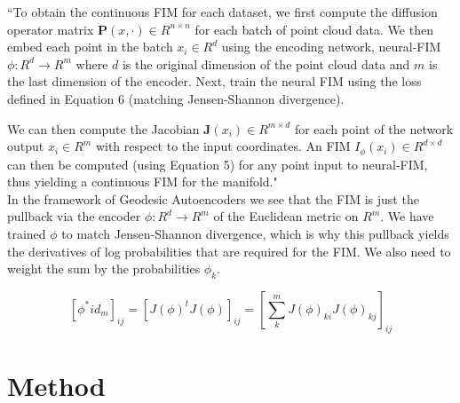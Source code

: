 \documentclass{article}
\theoremstyle{plain}
\theoremstyle{definition}
\theoremstyle{remark}
\begin{document}
``To obtain the continuous FIM for each dataset, we first compute the diffusion operator matrix $\mathbf{P}(x,\cdot) \in R^{n \times n}$ for each batch of point cloud data. We then embed each point in the batch $x_i \in R^{d}$ using the encoding network, neural-FIM $\phi: R^{d} \to R^{m} $ where $d$ is the original dimension of the point cloud data and $m$ is the last dimension of the encoder. Next, train the neural FIM using the loss defined in Equation 6 (matching Jensen-Shannon divergence).

We can then compute the Jacobian  $\mathbf{J}(x_i) \in R^{m \times d}$ for each point of the network output  $x_i \in R^m$  with respect to the input coordinates. An FIM $I_\phi(x_i) \in R^{d \times d}$ can then be computed (using Equation 5) for any point input to neural-FIM, thus yielding a continuous FIM for the manifold." \\

In the framework of Geodesic Autoencoders we see that the FIM is just the pullback via the encoder $\phi: R^{d} \to R^{m} $ of the Euclidean metric on $R^m$. We have trained $\phi$ to match Jensen-Shannon divergence, which is why this pullback yields the derivatives of log probabilities that are required for the FIM. We also need to weight the sum by the probabilities $\phi_k$.

$$[\phi^* id_m]_{ij} = [J(\phi)^tJ(\phi)]_{ij}= [ \sum_k^m J(\phi)_{ki} J(\phi)_{kj} ]_{ij} $$



\section{Method}

\end{document}
